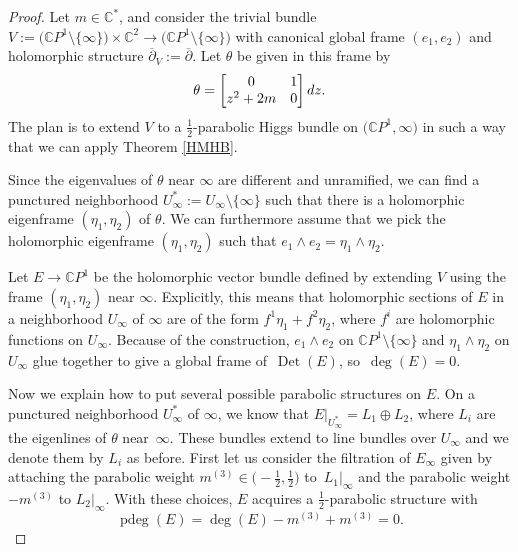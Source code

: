 \documentclass[11pt]{article}
\numberwithin{equation}{section}
\numberwithin{equation}{section}
\newcommand{\CP}{\mathbb{C}P^1}
\begin{document}
\begin{proof}
Let $m\in \mathbb{C}^*$, and consider the trivial bundle $V:=\bigl(\CP \setminus \{\infty\}\bigr)\times \mathbb{C}^2 \to \bigl(\CP \setminus \{\infty\}\bigr)$ with canonical global frame $(e_1,e_2)$ and holomorphic structure $\overline{\partial}_V:=\overline{\partial}$. Let $\theta$ be given in this frame by
\begin{equation*}
\theta= \begin{bmatrix}
 0& 1\\
 z^2+2m & 0\\
 \end{bmatrix}{\rm d}z.
\end{equation*}
The plan is to extend $V$ to a $\frac{1}{2}$-parabolic Higgs bundle on $\bigl(\CP,\infty\bigr)$ in such a way that we can apply Theorem \ref{HMHB}.

Since the eigenvalues of $\theta$ near $\infty$ are different and unramified, we can find a punctured neighborhood $U^*_{\infty}:=U_{\infty}\setminus \{\infty\}$ such that there is a holomorphic eigenframe $(\eta_1,\eta_2)$ of $\theta$. We can furthermore assume that we pick the holomorphic eigenframe $(\eta_1,\eta_2)$ such that $e_1\wedge e_2 = \eta_1\wedge \eta_2$.

Let $E\to \CP$ be the holomorphic vector bundle defined by extending $V$ using the frame $(\eta_1,\eta_2)$ near $\infty$. Explicitly, this means that holomorphic sections of $E$ in a neighborhood $U_{\infty}$ of $\infty$ are of the form $f^1\eta_1+f^2\eta_2$, where $f^i$ are holomorphic functions on $U_{\infty}$. Because of the construction, $e_1\wedge e_2$ on $\CP \setminus \{\infty\}$ and $\eta_1\wedge \eta_2$ on $U_{\infty}$ glue together to give a global frame of~$\operatorname{Det}(E)$, so~$\operatorname{deg}(E)=0$.

Now we explain how to put several possible parabolic structures on $E$. On a punctured neighborhood $U_{\infty}^*$ of $\infty$, we know that $E|_{U_{\infty}^*}=L_1\oplus L_2$, where $L_i$ are the eigenlines of $\theta$ near~$\infty$. These bundles extend to line bundles over $U_{\infty}$ and we denote them by $L_i$ as before. First let us consider the filtration of $E_{\infty}$ given by attaching the parabolic weight $m^{(3)} \in \bigl(-\frac12,\frac12\bigr)$ to~$L_1|_{\infty}$ and the parabolic weight $-m^{(3)}$ to $L_2|_{\infty}$. With these choices, $E$ acquires a $\frac{1}{2}$-parabolic structure with
\begin{equation*}
 \operatorname{pdeg}(E)=\operatorname{deg}(E)-m^{(3)}+m^{(3)}=0.
\end{equation*}


\end{proof}
\end{document}
